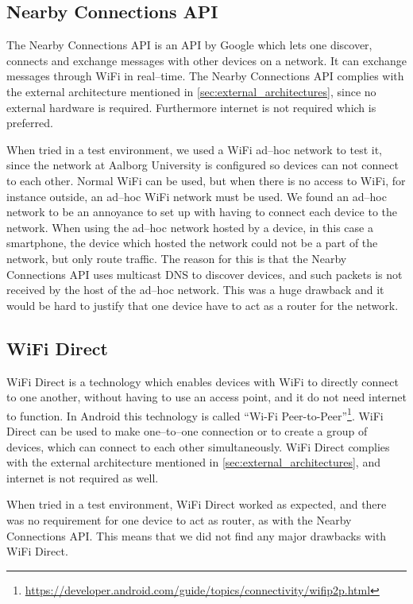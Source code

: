 \subsection{Nearby Connections API}
The Nearby Connections API is an API by Google which lets one discover, connects and exchange messages with other devices on a network. 
It can exchange messages through WiFi in real--time.\cite{nearby_connection} 
The Nearby Connections API complies with the external architecture mentioned in \cref{sec:external_architectures},
since no external hardware is required.
Furthermore internet is not required which is preferred.

When tried in a test environment, we used a WiFi ad--hoc network to test it,
since the network at Aalborg University is configured so devices can not connect to each other.
Normal WiFi can be used, but when there is no access to WiFi, for instance outside, an ad--hoc WiFi network must be used. 
We found an ad--hoc network to be an annoyance to set up with having to connect each device to the network.
When using the ad--hoc network hosted by a device, in this case a smartphone,
the device which hosted the network could not be a part of the network, but only route traffic.
The reason for this is that the Nearby Connections API uses multicast DNS to discover devices,
and such packets is not received by the host of the ad--hoc network.
This was a huge drawback and it would be hard to justify that one device have to act as a router for the network.

\subsection{WiFi Direct}
WiFi Direct is a technology which enables devices with WiFi to directly connect to one another,
without having to use an access point, and it do not need internet to function.
In Android this technology is called ``Wi-Fi Peer-to-Peer''\footnote{\url{https://developer.android.com/guide/topics/connectivity/wifip2p.html}}. 
WiFi Direct can be used to make one--to--one connection or to create a group of devices,
which can connect to each other simultaneously.\cite{wifi_direct}
WiFi Direct complies with the external architecture mentioned in \cref{sec:external_architectures}, and internet is not required as well. 

When tried in a test environment, WiFi Direct worked as expected,
and there was no requirement for one device to act as router, as with the Nearby Connections API.
This means that we did not find any major drawbacks with WiFi Direct.

